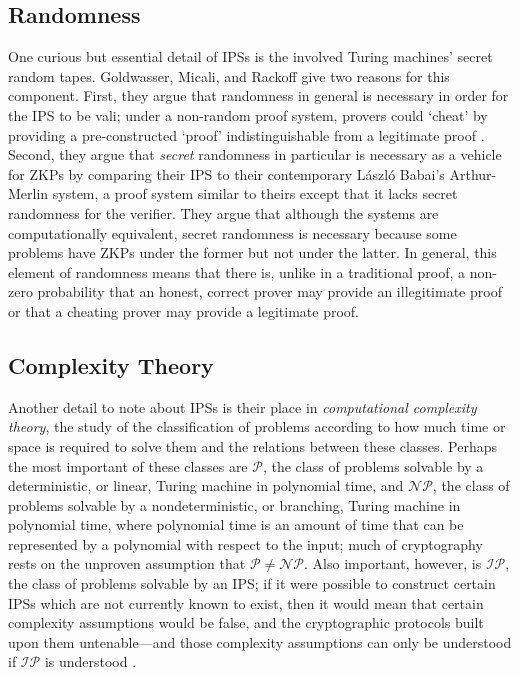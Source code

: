 \documentclass{article}
\begin{document}
\begin{adjustwidth}{0.5in}{0in}
\subsection{Randomness}

One curious but essential detail of IPSs is the involved Turing machines' secret random tapes. Goldwasser, Micali, and Rackoff give two reasons for this component. First, they argue that randomness in general is necessary in order for the IPS to be vali; under a non-random proof system, provers could `cheat' by providing a pre-constructed `proof' indistinguishable from a legitimate proof \cite{GMR}. Second, they argue that \textit{secret} randomness in particular is necessary as a vehicle for ZKPs by comparing their IPS to their contemporary László Babai's Arthur-Merlin system, a proof system similar to theirs except that it lacks secret randomness for the verifier. They argue that although the systems are computationally equivalent, secret randomness is necessary because some problems have ZKPs under the former but not under the latter. In general, this element of randomness means that there is, unlike in a traditional proof, a non-zero probability that an honest, correct prover may provide an illegitimate proof or that a cheating prover may provide a legitimate proof.


\subsection{Complexity Theory}

Another detail to note about IPSs is their place in \textit{computational complexity theory}, the study of the classification of problems according to how much time or space is required to solve them and the relations between these classes. Perhaps the most important of these classes are $\mathcal{P}$, the class of problems solvable by a deterministic, or linear, Turing machine in polynomial time, and $\mathcal{NP}$, the class of problems solvable by a nondeterministic, or branching, Turing machine in polynomial time, where polynomial time is an amount of time that can be represented by a polynomial with respect to the input; much of cryptography rests on the unproven assumption that $\mathcal{P} \neq \mathcal{NP}$. Also important, however, is $\mathcal{IP}$, the class of problems solvable by an IPS; if it were possible to construct certain IPSs which are not currently known to exist, then it would mean that certain complexity assumptions would be false, and the cryptographic protocols built upon them untenable---and those complexity assumptions can only be understood if $\mathcal{IP}$ is understood \cite{GMR}.


\end{adjustwidth}
\end{document}
